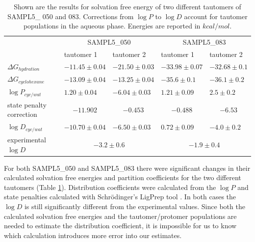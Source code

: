 \begin{table}
\begin{tabular}{| l | l l | l l |}
\hline
& \multicolumn{2}{|c|}{SAMPL5\_050} & \multicolumn{2}{|c|}{SAMPL5\_083} \\
& tautomer 1 & tautomer 2 & tautomer 1 & tautomer 2 \\
\hline
$\Delta G_{hydration}$ & $ -11.45 \pm 0.04 $ &  $ -21.50 \pm 0.03$ &  $-33.98 \pm 0.07$ &  $-32.68 \pm 0.1$ \\
$\Delta G_{cyclohexane}$ & $ -13.09 \pm 0.04 $ &  $ -13.25 \pm 0.04$ &  $-35.6 \pm 0.1$ &  $-36.1 \pm 0.2$ \\
$\log P_{cyc/wat}$ & $ 1.20 \pm 0.04 $ &  $ -6.04 \pm 0.03$ &  $1.21 \pm 0.09$ &  $2.5 \pm 0.2$ \\
state penalty correction & \multicolumn{1}{c}{$ -11.902 $} &  \multicolumn{1}{c|}{$ -0.453$} &  \multicolumn{1}{c}{$ -0.488 $} &  \multicolumn{1}{c|}{$ -6.53 $} \\
$\log D_{cyc/wat}$ & $ -10.70 \pm 0.04 $ &  $ -6.50 \pm 0.03$ &  $0.72 \pm 0.09$ &  $-4.0 \pm 0.2$ \\
\hline
experimental $\log D$ & \multicolumn{2}{|c|}{$-3.2 \pm 0.6$} & \multicolumn{2}{|c|}{$-1.9 \pm 0.4 $} \\
\hline
\end{tabular}
\label{tautomerChanges}
\caption{Shown are the results for solvation free energy of two different tautomers of SAMPL5\_ 050 and 083. Corrections from $\log P$ to $\log D$ account for tautomer populations in the aqueous phase. Energies are reported in $kcal/mol$.}
\end{table}
For both SAMPL5\_050 and SAMPL5\_083 there were significant changes in their calculated solvation free energies and partition coefficients for the two different tautomers (Table \ref{tautomerChanges}).
Distribution coefficients were calculated from the $\log P$ and state penalties calculated with Schr\"{o}dinger's LigPrep tool  \cite{ligprep}. 
In both cases the $\log D$ is still significantly different from the experimental values. 
Since both the calculated solvation free energies and the tautomer/protomer populations are needed to estimate the distribution coefficient, it is impossible for us to know which calculation introduces more error into our estimates.  
